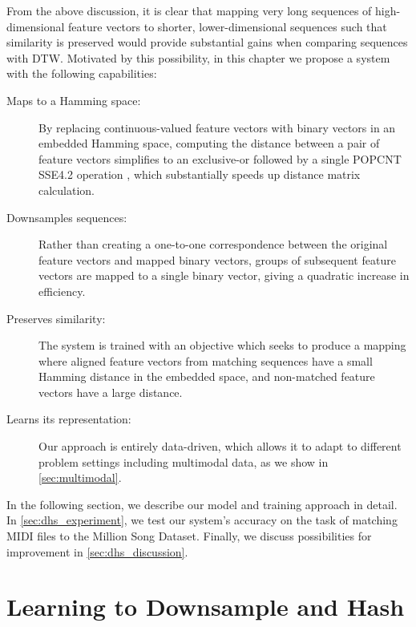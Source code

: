 From the above discussion, it is clear that mapping very long sequences of high-dimensional feature vectors to shorter, lower-dimensional sequences such that similarity is preserved would provide substantial gains when comparing sequences with DTW.
Motivated by this possibility, in this chapter we propose a system with the following capabilities:
\begin{description}
\item[Maps to a Hamming space:] By replacing continuous-valued feature vectors with binary vectors in an embedded Hamming space, computing the distance between a pair of feature vectors simplifies to an exclusive-or followed by a single POPCNT SSE4.2 operation \cite{intel2007programming}, which substantially speeds up distance matrix calculation.
\item[Downsamples sequences:] Rather than creating a one-to-one correspondence between the original feature vectors and mapped binary vectors, groups of subsequent feature vectors are mapped to a single binary vector, giving a quadratic increase in efficiency.
\item[Preserves similarity:] The system is trained with an objective which seeks to produce a mapping where aligned feature vectors from matching sequences have a small Hamming distance in the embedded space, and non-matched feature vectors have a large distance.
\item[Learns its representation:] Our approach is entirely data-driven, which allows it to adapt to different problem settings including multimodal data, as we show in \cref{sec:multimodal}.
\end{description}

In the following section, we describe our model and training approach in detail.
In \cref{sec:dhs_experiment}, we test our system's accuracy on the task of matching MIDI files to the Million Song Dataset.
Finally, we discuss possibilities for improvement in \cref{sec:dhs_discussion}.

\section{Learning to Downsample and Hash}
\label{sec:hashing_model}


